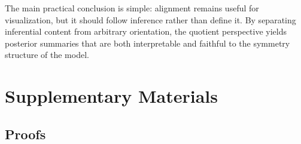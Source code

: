 \documentclass[12pt]{article}
\begin{document}
The main practical conclusion is simple: alignment remains useful for visualization, but it should
follow inference rather than define it. By separating inferential content from arbitrary
orientation, the quotient perspective yields posterior summaries that are both interpretable and
faithful to the symmetry structure of the model.











\newpage
\section*{Supplementary Materials}\label{sec:supp}

\subsection*{Proofs}
\end{document}
